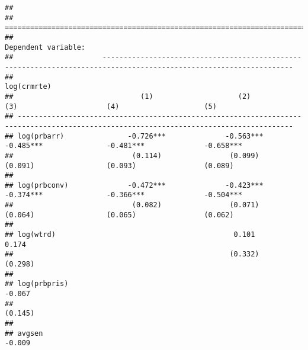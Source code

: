 \documentclass[]{article}
\begin{document}
\begin{verbatim}
## 
## =======================================================================================================================================
##                                                                     Dependent variable:                                                
##                     -------------------------------------------------------------------------------------------------------------------
##                                                                         log(crmrte)                                                    
##                              (1)                    (2)                    (3)                     (4)                    (5)          
## ---------------------------------------------------------------------------------------------------------------------------------------
## log(prbarr)               -0.726***              -0.563***              -0.485***               -0.481***              -0.658***       
##                            (0.114)                (0.099)                (0.091)                 (0.093)                (0.089)        
##                                                                                                                                        
## log(prbconv)              -0.472***              -0.423***              -0.374***               -0.366***              -0.504***       
##                            (0.082)                (0.071)                (0.064)                 (0.065)                (0.062)        
##                                                                                                                                        
## log(wtrd)                                          0.101                                          0.174                                
##                                                   (0.332)                                        (0.298)                               
##                                                                                                                                        
## log(prbpris)                                                                                     -0.067                                
##                                                                                                  (0.145)                               
##                                                                                                                                        
## avgsen                                                                                           -0.009                                

\end{verbatim}
\end{document}
